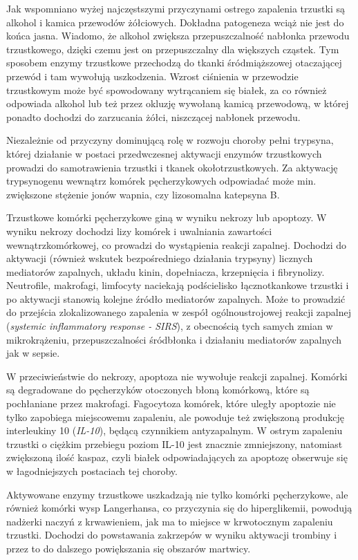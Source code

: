 \documentclass[a4paper, 12pt]{report}
\begin{document}
Jak wspomniano wyżej najczęstszymi przyczynami ostrego zapalenia
trzustki są alkohol i kamica przewodów żółciowych. Dokładna patogeneza
wciąż nie jest do końca jasna. Wiadomo, że alkohol zwiększa
przepuszczalność nabłonka przewodu trzustkowego, dzięki czemu jest on
przepuszczalny dla większych cząstek. Tym sposobem enzymy trzustkowe
przechodzą do tkanki śródmiąższowej otaczającej przewód i tam wywołują
uszkodzenia. Wzrost ciśnienia w przewodzie trzustkowym może być spowodowany
wytrącaniem się białek, za co również odpowiada alkohol lub też przez
okluzję wywołaną kamicą przewodową, w której ponadto dochodzi do
zarzucania żółci, niszczącej nabłonek przewodu.

Niezależnie od przyczyny dominującą rolę w rozwoju choroby pełni
trypsyna, której działanie w postaci przedwczesnej aktywacji enzymów
trzustkowych prowadzi do samotrawienia trzustki i tkanek
okołotrzustkowych. Za aktywację trypsynogenu wewnątrz komórek
pęcherzykowych odpowiadać może min. zwiększone stężenie jonów wapnia,
czy lizosomalna katepsyna B.\cite{21} 

Trzustkowe komórki pęcherzykowe
giną w wyniku nekrozy lub apoptozy. W wyniku nekrozy dochodzi lizy
komórek i uwalniania zawartości wewnątrzkomórkowej, co prowadzi do
wystąpienia reakcji zapalnej. Dochodzi do aktywacji (również wskutek
bezpośredniego działania trypsyny) licznych
mediatorów zapalnych, układu kinin, dopełniacza, krzepnięcia i
fibrynolizy. Neutrofile, makrofagi, limfocyty naciekają podścielisko
łącznotkankowe trzustki i po aktywacji stanowią kolejne źródło
mediatorów zapalnych. Może to prowadzić do przejścia zlokalizowanego
zapalenia w zespół ogólnoustrojowej reakcji zapalnej (\textsl{systemic inflammatory response
  - SIRS}), z obecnością tych samych zmian w mikrokrążeniu,
przepuszczalności śródbłonka i działaniu mediatorów zapalnych jak w
sepsie. 

W przeciwieństwie do nekrozy, apoptoza nie wywołuje
reakcji zapalnej. Komórki są degradowane do pęcherzyków otoczonych
błoną komórkową, które są pochłaniane przez makrofagi. Fagocytoza
komórek, które uległy apoptozie nie tylko zapobiega miejscowemu
zapaleniu, ale powoduje też zwiększoną produkcję interleukiny 10
(\textsl{IL-10}), będącą czynnikiem antyzapalnym. W ostrym zapaleniu
trzustki o ciężkim przebiegu poziom IL-10 jest znacznie
zmniejszony,\cite{27} natomiast zwiększoną ilość kaspaz, czyli białek
odpowiadających za apoptozę obserwuje się w łagodniejszych postaciach
tej choroby.\cite{26}

Aktywowane enzymy trzustkowe uszkadzają nie tylko komórki
pęcherzykowe, ale również komórki wysp Langerhansa, co przyczynia się
do hiperglikemii, powodują nadżerki naczyń z krwawieniem, jak ma to
miejsce w krwotocznym zapaleniu trzustki. Dochodzi do powstawania
zakrzepów w wyniku aktywacji trombiny i przez to do dalszego
powiększania się obszarów martwicy. 
\end{document}
